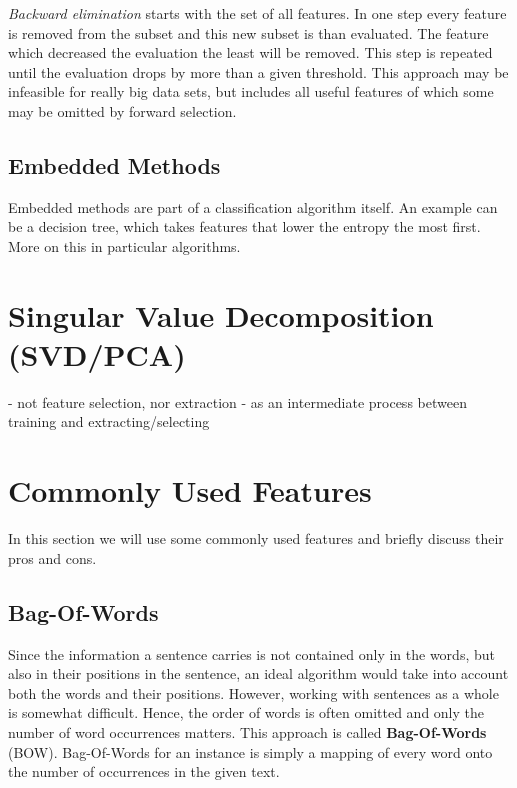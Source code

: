 {\it Backward elimination} starts with the set of all features. In one step every feature is removed from the subset and this new subset is than evaluated. The feature which decreased the evaluation the least will be removed. This step is repeated until the evaluation drops by more than a given threshold. This approach may be infeasible for really big data sets, but includes all useful features of which some may be omitted by forward selection.




\subsection{Embedded Methods}

Embedded methods are part of a classification algorithm itself. An example can be a decision tree, which takes features that lower the entropy the most first. More on this in particular algorithms.


\section{Singular Value Decomposition (SVD/PCA)}

 - not feature selection, nor extraction
 - as an intermediate process between training and extracting/selecting

\section{Commonly Used Features}

In this section we will use some commonly used features and briefly discuss their pros and cons.

\subsection{Bag-Of-Words}

Since the information a sentence carries is not contained only in the words, but also in their positions in the sentence, an ideal algorithm would take into account both the words and their positions.
However, working with sentences as a whole is somewhat difficult. Hence, the order of words is often omitted and only the number of word occurrences matters.
This approach is called {\bf Bag-Of-Words} (BOW). Bag-Of-Words for an instance is simply a mapping of every word onto the number of occurrences in the given text.

